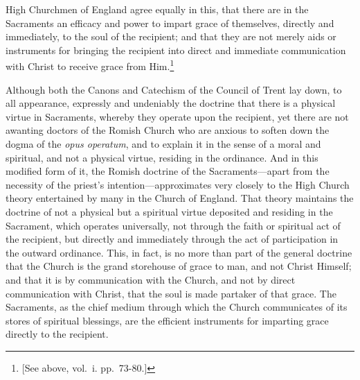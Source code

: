 \documentclass[]{book}
\begin{document}
High Churchmen of England agree equally in this, that there are in the Sacraments an efficacy and power to impart grace of themselves, directly and immediately, to the soul of the recipient; and that they are not merely aids or instruments for bringing the recipient into direct and immediate communication with Christ to receive grace from Him.\footnote{{[}See above, vol.~i. pp.~73-80.{]}}

Although both the Canons and Catechism of the Council of Trent lay down, to all appearance, expressly and undeniably the doctrine that there is a physical virtue in Sacraments, whereby they operate upon the recipient, yet there are not awanting doctors of the Romish Church who are anxious to soften down the dogma of the \emph{opus operatum}, and to explain it in the sense of a moral and spiritual, and not a physical virtue, residing in the ordinance. And in this modified form of it, the Romish doctrine of the Sacraments---apart from the necessity of the priest's intention---approximates very closely to the High Church theory entertained by many in the Church of England. That theory maintains the doctrine of not a physical but a spiritual virtue deposited and residing in the Sacrament, which operates universally, not through the faith or spiritual act of the recipient, but directly and immediately through the act of participation in the outward ordinance. This, in fact, is no more than part of the general doctrine that the Church is the grand storehouse of grace to man, and not Christ Himself; and that it is by communication with the Church, and not by direct communication with Christ, that the soul is made partaker of that grace. The Sacraments, as the chief medium through which the Church communicates of its stores of spiritual blessings, are the efficient instruments for imparting grace directly to the recipient.
\end{document}
